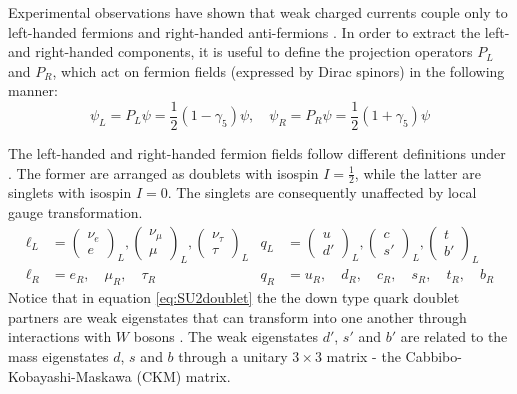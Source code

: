 Experimental observations have shown that weak charged currents couple only to left-handed fermions and right-handed anti-fermions \cite{Pich:2007vu}. In order to extract the left- and right-handed components, it is useful to define the projection operators $P_L$ and $P_R$, which act on fermion fields (expressed by Dirac spinors) in the following manner:
\begin{equation}
    \psi_{L}=P_{L}\psi=\dfrac{1}{2}(1- \gamma_5)\psi,\quad 
    \psi_{R}=P_{R}\psi=\dfrac{1}{2}(1+ \gamma_5)\psi
\end{equation}

The left-handed and right-handed fermion fields follow different definitions under . The former are arranged as doublets with isospin $I=\frac{1}{2}$, while the latter are singlets with isospin $I=0$. The singlets are consequently unaffected by  local gauge transformation.
\begin{align}\label{eq:SU2doublet}
    \ell_L & =
    \begin{pmatrix}
        \nu_e\\
        e
    \end{pmatrix}_L,
        \begin{pmatrix}
        \nu_{\mu}\\
        \mu
    \end{pmatrix}_L,
        \begin{pmatrix}
        \nu_{\tau}\\
        \tau
    \end{pmatrix}_L
    & q_L & =
    \begin{pmatrix}
        u\\
        d'
    \end{pmatrix}_L,
    \begin{pmatrix}
        c\\
        s'
    \end{pmatrix}_L,
    \begin{pmatrix}
        t\\
        b'
    \end{pmatrix}_L\\
    \ell_R & =e_R, \quad \mu_R, \quad \tau_R
    \qquad 
    & q_R & = u_R, \quad d_R, \quad c_R, \quad s_R, \quad t_R, \quad b_R
\end{align}
Notice that in equation \ref{eq:SU2doublet} the the down type quark doublet partners are weak eigenstates that can transform into one another through interactions with $W$ bosons \cite{Raby:1997bp}. The weak eigenstates $d'$, $s'$ and $b'$ are related to the mass eigenstates $d$, $s$ and $b$ through a unitary $3\times3$ matrix - the Cabbibo-Kobayashi-Maskawa (CKM) matrix. 
